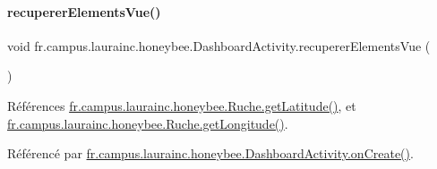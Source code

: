 \paragraph{\texorpdfstring{recuperer\+Elements\+Vue()}{recupererElementsVue()}}
{\footnotesize\ttfamily void fr.\+campus.\+laurainc.\+honeybee.\+Dashboard\+Activity.\+recuperer\+Elements\+Vue (\begin{DoxyParamCaption}{ }\end{DoxyParamCaption})\hspace{0.3cm}{\ttfamily [private]}}



Références \hyperlink{classfr_1_1campus_1_1laurainc_1_1honeybee_1_1_ruche_a3f03f6958a9251f72e60e45a6b8eb65c}{fr.\+campus.\+laurainc.\+honeybee.\+Ruche.\+get\+Latitude()}, et \hyperlink{classfr_1_1campus_1_1laurainc_1_1honeybee_1_1_ruche_a45b3656e287e168f17fdd1b9ec5fbca1}{fr.\+campus.\+laurainc.\+honeybee.\+Ruche.\+get\+Longitude()}.



Référencé par \hyperlink{classfr_1_1campus_1_1laurainc_1_1honeybee_1_1_dashboard_activity_a8a6794a48e1b328dfc58d9d1c9237d79}{fr.\+campus.\+laurainc.\+honeybee.\+Dashboard\+Activity.\+on\+Create()}.


